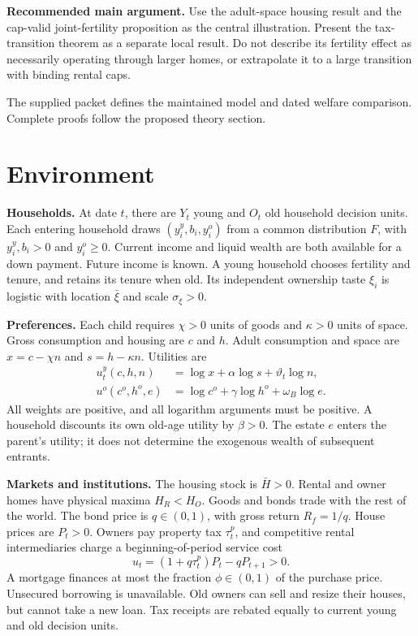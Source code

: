 \documentclass[11pt]{article}
\newcommand{\HH}{\bar H}
\newcommand{\tht}{\vartheta}
\begin{document}
\textbf{Recommended main argument.} Use the adult-space housing result and the cap-valid joint-fertility proposition as the central illustration. Present the tax-transition theorem as a separate local result. Do not describe its fertility effect as necessarily operating through larger homes, or extrapolate it to a large transition with binding rental caps.

The supplied packet defines the maintained model and dated welfare comparison. Complete proofs follow the proposed theory section.
\clearpage
\section{Environment}\label{sec:environment}
\textbf{Households.} At date $t$, there are $Y_t$ young and $O_t$ old household decision units. Each entering household draws $(y_i^y,b_i,y_i^o)$ from a common distribution $F$, with $y_i^y,b_i>0$ and $y_i^o\ge0$. Current income and liquid wealth are both available for a down payment. Future income is known. A young household chooses fertility and tenure, and retains its tenure when old. Its independent ownership taste $\xi_i$ is logistic with location $\bar\xi$ and scale $\sigma_\xi>0$.

\textbf{Preferences.} Each child requires $\chi>0$ units of goods and $\kappa>0$ units of space. Gross consumption and housing are $c$ and $h$. Adult consumption and space are $x=c-\chi n$ and $s=h-\kappa n$. Utilities are
\begin{align}
 u_t^y(c,h,n)&=\log x+\alpha\log s+\tht_t\log n,\label{eq:uy}\\
 u^o(c^o,h^o,e)&=\log c^o+\gamma\log h^o+\omega_B\log e.\label{eq:uo}
\end{align}
All weights are positive, and all logarithm arguments must be positive. A household discounts its own old-age utility by $\beta>0$. The estate $e$ enters the parent's utility; it does not determine the exogenous wealth of subsequent entrants.

\textbf{Markets and institutions.} The housing stock is $\HH>0$. Rental and owner homes have physical maxima $H_R<H_O$. Goods and bonds trade with the rest of the world. The bond price is $q\in(0,1)$, with gross return $R_f=1/q$. House prices are $P_t>0$. Owners pay property tax $\tau_t^p$, and competitive rental intermediaries charge a beginning-of-period service cost
\begin{equation}
 u_t=(1+q\tau_t^p)P_t-qP_{t+1}>0.\label{eq:usercost}
\end{equation}
A mortgage finances at most the fraction $\phi\in(0,1)$ of the purchase price. Unsecured borrowing is unavailable. Old owners can sell and resize their houses, but cannot take a new loan. Tax receipts are rebated equally to current young and old decision units.
\end{document}
